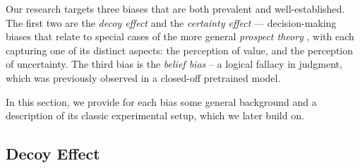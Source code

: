  Our research targets three biases
that are both prevalent and well-established.
The first two are the \emph{decoy effect} and the \emph{certainty effect} --- decision-making biases that relate to special cases of the more general \emph{prospect theory} \cite{kahneman1979prospect},
with each capturing one of its distinct aspects: the perception of value, and the perception of uncertainty.
The third bias is the \emph{belief bias} --  a logical fallacy in judgment, 
which was previously observed in a closed-off pretrained model.%

In this section, we provide for each bias some general background and a description of its classic experimental setup, which we later build on.




\subsection{Decoy Effect} \label{subsec:def_decoy}


